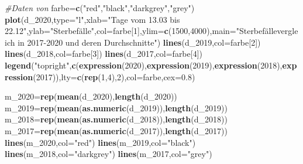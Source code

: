 \documentclass[
]{article}
\newenvironment{Shaded}{\begin{snugshade}}{\end{snugshade}}
\newcommand{\CommentTok}[1]{\textcolor[rgb]{0.56,0.35,0.01}{\textit{#1}}}
\newcommand{\DataTypeTok}[1]{\textcolor[rgb]{0.13,0.29,0.53}{#1}}
\newcommand{\DecValTok}[1]{\textcolor[rgb]{0.00,0.00,0.81}{#1}}
\newcommand{\FloatTok}[1]{\textcolor[rgb]{0.00,0.00,0.81}{#1}}
\newcommand{\KeywordTok}[1]{\textcolor[rgb]{0.13,0.29,0.53}{\textbf{#1}}}
\newcommand{\NormalTok}[1]{#1}
\newcommand{\StringTok}[1]{\textcolor[rgb]{0.31,0.60,0.02}{#1}}
\begin{document}
\begin{Shaded}
\begin{Highlighting}[]
\CommentTok{#Daten von }
\NormalTok{farbe=}\KeywordTok{c}\NormalTok{(}\StringTok{"red"}\NormalTok{,}\StringTok{"black"}\NormalTok{,}\StringTok{"darkgrey"}\NormalTok{,}\StringTok{"grey"}\NormalTok{)}
\KeywordTok{plot}\NormalTok{(d_}\DecValTok{2020}\NormalTok{,}\DataTypeTok{type=}\StringTok{"l"}\NormalTok{,}\DataTypeTok{xlab=}\StringTok{"Tage vom 13.03 bis 22.12"}\NormalTok{,}\DataTypeTok{ylab=}\StringTok{"Sterbefälle"}\NormalTok{,}\DataTypeTok{col=}\NormalTok{farbe[}\DecValTok{1}\NormalTok{],}\DataTypeTok{ylim=}\KeywordTok{c}\NormalTok{(}\DecValTok{1500}\NormalTok{,}\DecValTok{4000}\NormalTok{),}\DataTypeTok{main=}\StringTok{"Sterbefällevergleich in 2017-2020 und deren Durchschnitte"}\NormalTok{)}
\KeywordTok{lines}\NormalTok{(d_}\DecValTok{2019}\NormalTok{,}\DataTypeTok{col=}\NormalTok{farbe[}\DecValTok{2}\NormalTok{])}
\KeywordTok{lines}\NormalTok{(d_}\DecValTok{2018}\NormalTok{,}\DataTypeTok{col=}\NormalTok{farbe[}\DecValTok{3}\NormalTok{])}
\KeywordTok{lines}\NormalTok{(d_}\DecValTok{2017}\NormalTok{,}\DataTypeTok{col=}\NormalTok{farbe[}\DecValTok{4}\NormalTok{])}
\KeywordTok{legend}\NormalTok{(}\StringTok{"topright"}\NormalTok{,}\KeywordTok{c}\NormalTok{(}\KeywordTok{expression}\NormalTok{(}\DecValTok{2020}\NormalTok{),}\KeywordTok{expression}\NormalTok{(}\DecValTok{2019}\NormalTok{),}\KeywordTok{expression}\NormalTok{(}\DecValTok{2018}\NormalTok{),}\KeywordTok{expression}\NormalTok{(}\DecValTok{2017}\NormalTok{)),}\DataTypeTok{lty=}\KeywordTok{c}\NormalTok{(}\KeywordTok{rep}\NormalTok{(}\DecValTok{1}\NormalTok{,}\DecValTok{4}\NormalTok{),}\DecValTok{2}\NormalTok{),}\DataTypeTok{col=}\NormalTok{farbe,}\DataTypeTok{cex=}\FloatTok{0.8}\NormalTok{)}

\NormalTok{m_}\DecValTok{2020}\NormalTok{=}\KeywordTok{rep}\NormalTok{(}\KeywordTok{mean}\NormalTok{(d_}\DecValTok{2020}\NormalTok{),}\KeywordTok{length}\NormalTok{(d_}\DecValTok{2020}\NormalTok{))}
\NormalTok{m_}\DecValTok{2019}\NormalTok{=}\KeywordTok{rep}\NormalTok{(}\KeywordTok{mean}\NormalTok{(}\KeywordTok{as.numeric}\NormalTok{(d_}\DecValTok{2019}\NormalTok{)),}\KeywordTok{length}\NormalTok{(d_}\DecValTok{2019}\NormalTok{))}
\NormalTok{m_}\DecValTok{2018}\NormalTok{=}\KeywordTok{rep}\NormalTok{(}\KeywordTok{mean}\NormalTok{(}\KeywordTok{as.numeric}\NormalTok{(d_}\DecValTok{2018}\NormalTok{)),}\KeywordTok{length}\NormalTok{(d_}\DecValTok{2018}\NormalTok{))}
\NormalTok{m_}\DecValTok{2017}\NormalTok{=}\KeywordTok{rep}\NormalTok{(}\KeywordTok{mean}\NormalTok{(}\KeywordTok{as.numeric}\NormalTok{(d_}\DecValTok{2017}\NormalTok{)),}\KeywordTok{length}\NormalTok{(d_}\DecValTok{2017}\NormalTok{))}
\KeywordTok{lines}\NormalTok{(m_}\DecValTok{2020}\NormalTok{,}\DataTypeTok{col=}\StringTok{"red"}\NormalTok{)}
\KeywordTok{lines}\NormalTok{(m_}\DecValTok{2019}\NormalTok{,}\DataTypeTok{col=}\StringTok{"black"}\NormalTok{)}
\KeywordTok{lines}\NormalTok{(m_}\DecValTok{2018}\NormalTok{,}\DataTypeTok{col=}\StringTok{"darkgrey"}\NormalTok{)}
\KeywordTok{lines}\NormalTok{(m_}\DecValTok{2017}\NormalTok{,}\DataTypeTok{col=}\StringTok{"grey"}\NormalTok{)}
\end{Highlighting}
\end{Shaded}
\end{document}
